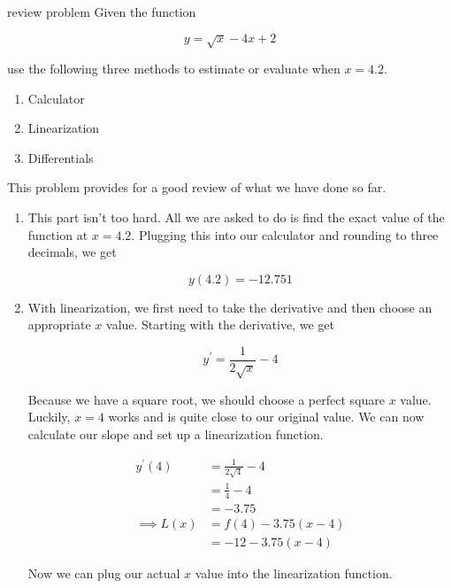 \begin{examplebreak}{review problem}
    Given the function

    \[
        y = \sqrt{ x } - 4x + 2
    \]

    use the following three methods to estimate or evaluate when \( x = 4.2 \).

    \begin{enumerate}
        \item Calculator
        \item Linearization
        \item Differentials
    \end{enumerate}

    \vspace{0.3cm}

    This problem provides for a good review of what we have done so far.

    \begin{enumerate}
        \item This part isn't too hard. All we are asked to do is find the exact value of the function at \( x = 4.2 \). Plugging this into our calculator and rounding to three decimals, we get

        \[
            y \left( 4.2 \right) = -12.751
        \]

        \item With linearization, we first need to take the derivative and then choose an appropriate \( x \) value. Starting with the derivative, we get

        \[
            y^\prime = \frac{1}{2 \sqrt{ x }} - 4
        \]

        Because we have a square root, we should choose a perfect square \( x \) value. Luckily, \( x = 4 \) works and is quite close to our original value. We can now calculate our slope and set up a linearization function.

        \begin{align*}
            y^\prime \left( 4 \right) &= \frac{1}{2 \sqrt{ 4 }} - 4 \\
            &= \frac{1}{4} - 4 \\
            &= -3.75 \\
            \implies L \left( x \right) &= f \left( 4 \right) - 3.75 \left( x - 4 \right) \\
            &= -12 - 3.75 \left( x - 4 \right)
        \end{align*}

        Now we can plug our actual \( x \) value into the linearization function.


\end{enumerate}
\end{examplebreak}
